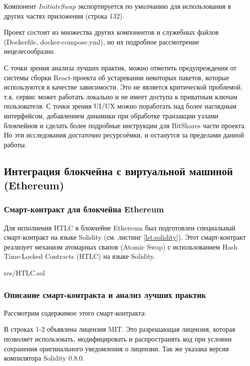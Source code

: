 Компонент \textit{InitiateSwap} экспортируется по умолчанию для использования в других частях приложения (строка 132).

Проект состоит из множества других компонентов и служебных файлов (Dockerfile, docker-compose.yml), но их подробное рассмотрение нецелесообразно.

С точки зрения анализа лучших практик, можно отметить предупреждения от системы сборки React-проекта об устаревании некоторых пакетов, которые используются в качестве зависимости. Это не является критической проблемой, т.к. сервис может работать локально и не имеет доступа к приватным ключам пользователя. С точки зрения UI/UX можно поработать над более наглядным интерфейсом, добавлением динамики при обработке транзакции узлами блокчейнов и сделать более подробные инструкции для BitShares части проекта. Но эти исследования достаточно ресурсоёмки, и останутся за пределами данной работы.

\subsection{Интеграция блокчейна с виртуальной машиной (Ethereum)}

\subsubsection{Смарт-контракт для блокчейна Ethereum}

Для исполнения HTLC в блокчейне Ethereum был подготовлен специальный смарт-контракт на языке Solidity (см. листинг \ref{lst:solidity}). Этот смарт-контракт реализует механизм атомарных свапов (Atomic Swap) с использованием Hash Time-Locked Contracts (HTLC) на языке Solidity.


{res/HTLC.sol}

\subsubsection{Описание смарт-контракта и анализ лучших практик}

Рассмотрим содержимое этого смарт-контракта:

В строках 1-2 объявлена лицензия MIT. Это разрешающая лицензия, которая позволяет использовать, модифицировать и распространять код при условии сохранения оригинального уведомления о лицензии. Так же указана версия компилятора Solidity 0.8.0.
   
